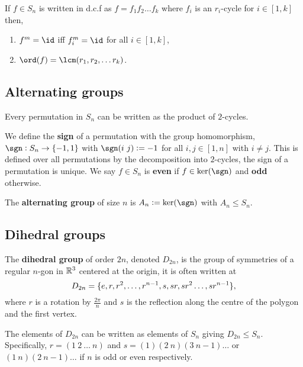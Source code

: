 \begin{theorem}
    If $f\in S_n$ is written in d.c.f as $f=f_1f_2\ldots f_k$ where $f_i$ is an $r_i$-cycle for $i\in[1,k]$ then, \begin{enumerate}
        \item $f^m=\id$ iff $f_i^m=\id$ for all $i\in[1,k]$,
        \item $\ord(f) = \lcm(r_1,r_2,\ldots r_k)$.
    \end{enumerate}
\end{theorem}

\subsection{Alternating groups}

\begin{theorem}
    Every permutation in $S_n$ can be written as the product of $2$-cycles.
\end{theorem}

\begin{definition}
    We define the \textbf{sign} of a permutation with the group homomorphism, $\sgn:S_n\rightarrow\{-1,1\}$ with $\sgn(i \ j) := -1$ for all $i,j\in[1,n]$ with $i\neq j$. This is defined over all permutations by the decomposition into $2$-cycles, the sign of a permutation is unique. We say $f\in S_n$ is \textbf{even} if $f\in\ker(\sgn)$ and \textbf{odd} otherwise.
\end{definition}

\begin{definition}
    The \textbf{alternating group} of size $n$ is $A_n := \ker(\sgn)$ with $A_n\leq S_n$.
\end{definition}

\subsection{Dihedral groups}

\begin{definition}
    The \textbf{dihedral group} of order $2n$, denoted $D_{2n}$, is the group of symmetries of a regular $n$-gon in $\mathbb{R}^3$ centered at the origin, it is often written at \[
        D_{2n} = \{e,r,r^2,\ldots,r^{n-1},s,sr,sr^2\ldots,sr^{n-1}\}
    \textcolor{black}{,}
    \] where $r$ is a rotation by $\frac{2\pi}{n}$ and $s$ is the reflection along the centre of the polygon and the first vertex.
\end{definition}

\begin{theorem}
    The elements of $D_{2n}$ can be written as elements of $S_n$ giving $D_{2n}\leq S_n$. Specifically, $r = (1 \ 2 \ \ldots \ n)$ and $s = (1)(2 \ n)(3 \ n-1)\ldots$ or $(1 \ n)(2 \ n-1)\ldots$ if $n$ is odd or even respectively.
\end{theorem}

